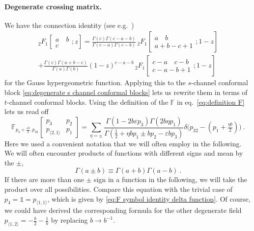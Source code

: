 \documentclass[12pt,a4paper]{article}
\newcommand{\be}{\begin{equation}}
\newcommand{\ee}{\end{equation}}
\newcommand\id{\mathds{1}}
\begin{document}
\paragraph{Degenerate crossing matrix.} We have the connection identity (see e.g.\ \cite[eq.~(15.3.6)]{Abramowitz})
\begin{multline}  
{}_2F_1\left[\begin{array}{c}
     a \quad b\\ c
\end{array}; z\right]=\frac{\Gamma(c)\Gamma(c-a-b)}{\Gamma(c-a)\Gamma(c-b)}\,  {}_2F_1 \left[\begin{array}{c}
     a \quad b\\ a+b-c+1
\end{array}; 1-z\right]\\
+\frac{\Gamma(c)\Gamma(a+b-c)}{\Gamma(a)\Gamma(b)} (1-z)^{c-a-b} \, {}_2 F_1 \left[\begin{array}{c}
     c-a \quad c-b\\ c-a-b+1
\end{array}; 1-z\right]
\end{multline}
for the Gauss hypergeometric function. Applying this to the $s$-channel conformal block \eqref{eq:degenerate s channel conformal blocks} lets us rewrite them in terms of $t$-channel conformal blocks. Using the definition of the $\mathbb{F}$ in eq.~\eqref{eq:definition F} lets us read off
\be   
\mathbb{F}_{p_3+\frac{\varepsilon b}{2},p_{32}}\!\begin{bmatrix}
    p_3 & p_2 \\ 
    p_{\langle 2,1 \rangle} & p_1
\end{bmatrix}=\sum_{\eta=\pm} \frac{\Gamma(1-2b\varepsilon p_3)\Gamma(2b\eta p_1)}{\Gamma(\frac{1}{2}+\eta b p_1\pm bp_2-\varepsilon b p_3)} \delta\big(p_{32}-(p_1+\tfrac{\eta b}{2})\big)\ . \label{eq:degenerate crossing kernel}
\ee
Here we used a convenient notation that we will often employ in the following. We will often encounter products of functions with different signs and mean by the $\pm$,
\be 
\Gamma(a\pm b) \equiv \Gamma(a+b)\Gamma(a-b)\ .
\ee
If there are more than one $\pm$ sign in a function in the following, we will take the product over all possibilities.
Compare this equation with the trivial case of $p_4=\id=p_{\langle 1,1 \rangle}$, which is given by \eqref{eq:F symbol identity delta function}. 
Of course, we could have derived the corresponding formula for the other degenerate field $p_{\langle 1,2\rangle}=-\frac{b}{2}-\frac{1}{b}$ by replacing $b \to b^{-1}$.
\end{document}
